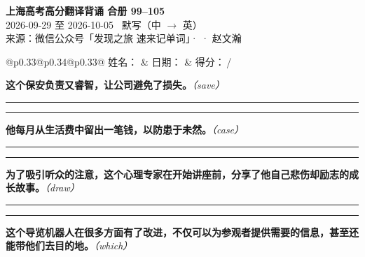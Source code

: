 \documentclass[11pt,a4paper]{article}
\newcommand{\num}[1]{\makebox[1.9em][r]{#1.}\hspace{0.3em}}
\newcommand{\wline}{\noindent\rule{\linewidth}{0.4pt}}
\newcommand{\prompt}[1]{\emph{\textcolor{tipblue}{\small（#1）}}}
\begin{document}
\pagestyle{plain}
\begin{center}
{\LARGE\bfseries 上海高考高分翻译背诵 \quad 合册 99–105}\\[0.25em]
{\large 2026-09-29 至 2026-10-05 \quad\ 默写（中 $\to$ 英）}\\[0.35em]
{\footnotesize 来源：微信公众号「发现之旅 速来记单词」·  · 赵文瀚}
\end{center}

\vspace{0.4em}
\noindent\begin{tabular}{@{}p{0.33\textwidth}@{}p{0.34\textwidth}@{}p{0.33\textwidth}@{}}
姓名：\underline{\hspace{2.0cm}} & 日期：\underline{\hspace{2.0cm}} & 得分：\underline{\hspace{1.4cm}}\,/ \\
\end{tabular}

\vspace{0.5em}

\vspace{0.8em}
\vspace{0.35em}\vspace{0.15em}

\num{1}\textbf{这个保安负责又睿智，让公司避免了损失。}\prompt{save}

\vspace{0.3em}

\wline\vspace{0.3em}
\wline

\num{2}\textbf{他每月从生活费中留出一笔钱，以防患于未然。}\prompt{case}

\vspace{0.3em}

\wline\vspace{0.3em}
\wline

\num{3}\textbf{为了吸引听众的注意，这个心理专家在开始讲座前，分享了他自己悲伤却励志的成长故事。}\prompt{draw}

\vspace{0.3em}

\wline\vspace{0.3em}
\wline

\num{4}\textbf{这个导览机器人在很多方面有了改进，不仅可以为参观者提供需要的信息，甚至还能带他们去目的地。}\prompt{which}
\end{document}
